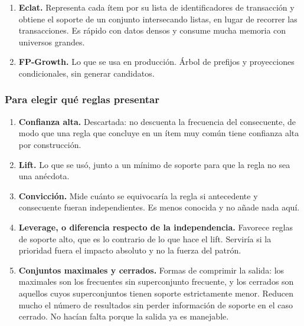 \documentclass[11pt]{article}
\begin{document}
\begin{enumerate}
  \item \textbf{Eclat.} Representa cada ítem por su lista de identificadores de transacción y obtiene el soporte de un conjunto intersecando listas, en lugar de recorrer las transacciones. Es rápido con datos densos y consume mucha memoria con universos grandes.
  \item \textbf{FP-Growth.} Lo que se usa en producción. Árbol de prefijos y proyecciones condicionales, sin generar candidatos.
\end{enumerate}
\subsubsection*{Para elegir qué reglas presentar}
\begin{enumerate}
  \item \textbf{Confianza alta.} Descartada: no descuenta la frecuencia del consecuente, de modo que una regla que concluye en un ítem muy común tiene confianza alta por construcción.
  \item \textbf{Lift.} Lo que se usó, junto a un mínimo de soporte para que la regla no sea una anécdota.
  \item \textbf{Convicción.} Mide cuánto se equivocaría la regla si antecedente y consecuente fueran independientes. Es menos conocida y no añade nada aquí.
  \item \textbf{Leverage, o diferencia respecto de la independencia.} Favorece reglas de soporte alto, que es lo contrario de lo que hace el lift. Serviría si la prioridad fuera el impacto absoluto y no la fuerza del patrón.
  \item \textbf{Conjuntos maximales y cerrados.} Formas de comprimir la salida: los maximales son los frecuentes sin superconjunto frecuente, y los cerrados son aquellos cuyos superconjuntos tienen soporte estrictamente menor. Reducen mucho el número de resultados sin perder información de soporte en el caso cerrado. No hacían falta porque la salida ya es manejable.
\end{enumerate}
\end{document}
